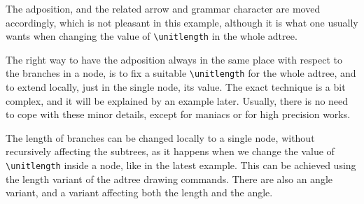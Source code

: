 \documentclass{amsart}
\begin{document}
The adposition, and the related arrow and grammar character are moved
accordingly, which is not pleasant in this example, although it is
what one usually wants when changing the value of \verb|\unitlength|
in the whole adtree. 

The right way to have the adposition always in the same place with
respect to the branches in a node, is to fix a suitable
\verb|\unitlength| for the whole adtree, and to extend locally, just
in the single node, its value. The exact technique is a bit complex,
and it will be explained by an example later. Usually, there is no
need to cope with these minor details, except for maniacs or for high
precision works.\vspace{1.5ex}

The length of branches can be changed locally to a single node,
without recursively affecting the subtrees, as it happens when we
change the value of \verb|\unitlength| inside a node, like in the
latest example. This can be achieved using the length variant of the
adtree drawing commands. There are also an angle variant, and a
variant affecting both the length and the angle.
\end{document}
